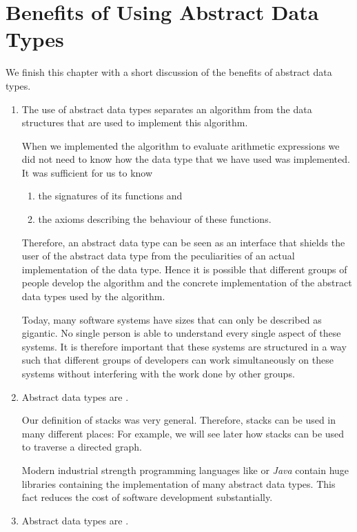 \section[Benefits of Abstract Data Types]{Benefits of Using Abstract Data Types}
We finish this chapter with a short discussion of the benefits of abstract data types.
 \begin{enumerate}
 \item The use of abstract data types separates an algorithm from the data structures that
       are used to implement this algorithm.

       When we implemented the algorithm to evaluate arithmetic expressions we did not need to know
       how the data type  that we have used was implemented.  It was sufficient for us to know 
       \begin{enumerate}
       \item the signatures of its functions and
       \item the axioms describing the behaviour of these functions.
       \end{enumerate}
       Therefore, an abstract data type can be seen as an interface that shields the user of the
       abstract data type from the peculiarities of an actual implementation of the data type.
       Hence it is possible that different groups of people develop the algorithm and the
       concrete implementation of the abstract data types used by the algorithm.  

       Today, many software systems have sizes that can only be described as gigantic.  No single
       person is able to understand every single aspect of these systems.  It is therefore important
       that these systems are structured in a way such that different groups of developers can work
       simultaneously on these systems without interfering with the work done by other groups.
 \item Abstract data types are .

       Our definition of stacks was very general.  Therefore, stacks can be used in many different
       places:  For example, we will see later how stacks can be used to traverse a directed graph.

       Modern industrial strength programming languages like  or \textsl{Java} contain
       huge libraries containing the implementation of many abstract data types.  This fact reduces
       the cost of software development substantially.     
 \item Abstract data types are .


\end{enumerate}
